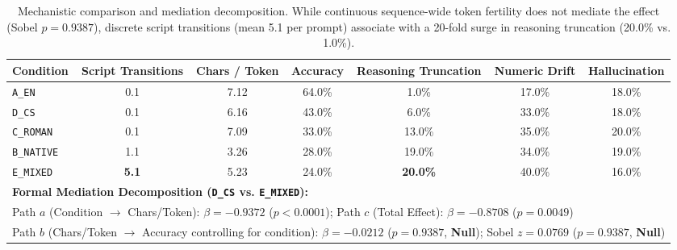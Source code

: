 \begin{table}[t]
\centering
\small
\begin{tabular}{lcccccc}
\toprule
\textbf{Condition} & \textbf{Script Transitions} & \textbf{Chars / Token} & \textbf{Accuracy} & \textbf{Reasoning Truncation} & \textbf{Numeric Drift} & \textbf{Hallucination} \\
\midrule
\texttt{A\_EN} & 0.1 & 7.12 & 64.0\% & 1.0\% & 17.0\% & 18.0\% \\
\texttt{D\_CS} & 0.1 & 6.16 & 43.0\% & 6.0\% & 33.0\% & 18.0\% \\
\texttt{C\_ROMAN} & 0.1 & 7.09 & 33.0\% & 13.0\% & 35.0\% & 20.0\% \\
\texttt{B\_NATIVE} & 1.1 & 3.26 & 28.0\% & 19.0\% & 34.0\% & 19.0\% \\
\texttt{E\_MIXED} & \textbf{5.1} & 5.23 & 24.0\% & \textbf{20.0\%} & 40.0\% & 16.0\% \\
\midrule
\multicolumn{7}{l}{\textbf{Formal Mediation Decomposition (\texttt{D\_CS} vs. \texttt{E\_MIXED}):}} \\
\multicolumn{7}{l}{Path $a$ (Condition $\to$ Chars/Token): $\beta = -0.9372$ ($p < 0.0001$); Path $c$ (Total Effect): $\beta = -0.8708$ ($p = 0.0049$)} \\
\multicolumn{7}{l}{Path $b$ (Chars/Token $\to$ Accuracy controlling for condition): $\beta = -0.0212$ ($p = 0.9387$, \textbf{Null}); Sobel $z = 0.0769$ ($p = 0.9387$, \textbf{Null})} \\
\bottomrule
\end{tabular}
\caption{Mechanistic comparison and mediation decomposition. While continuous sequence-wide token fertility does not mediate the effect (Sobel $p = 0.9387$), discrete script transitions (mean 5.1 per prompt) associate with a 20-fold surge in reasoning truncation (20.0\% vs. 1.0\%).}
\label{tab:mechanistic_analysis}
\end{table}
